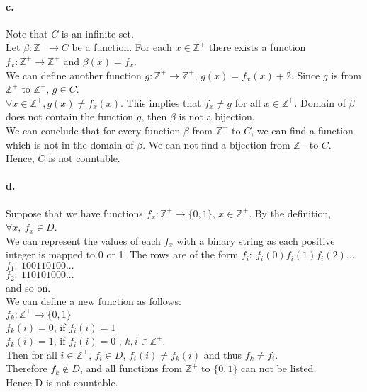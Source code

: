 \documentclass[11pt]{article}
\begin{document}
\paragraph{c.}
    Note that $C$ is an infinite set.\\
    Let $\beta : \mathbb{Z^+} \rightarrow C$ be a function. For each $x \in \mathbb{Z^+}$ there exists a function $f_x:\mathbb{Z^+} \rightarrow \mathbb{Z^+}$ and $\beta(x) = f_x$.\\
    We can define another function $g:\mathbb{Z^+} \rightarrow \mathbb{Z^+}$, $g(x) = f_x(x)+2$. Since $g$ is from $\mathbb{Z^+}$ to $\mathbb{Z^+}$, $g \in C$.\\$\forall x \in \mathbb{Z^+}, g(x) \neq f_x(x)$. This implies that $f_x \neq g$ for all $x \in \mathbb{Z^+}$. Domain of $\beta$ does not contain the function $g$, then $\beta$ is not a bijection.\\
    We can conclude that for every function $\beta$ from $\mathbb{Z^+}$ to $C$, we can find a function which is not in the domain of  $\beta$. We can not find a bijection from $\mathbb{Z^+}$ to $C$.\\
    Hence, $C$ is not countable. 
    
    
\paragraph{d.}
    Suppose that we have functions $f_x:\mathbb{Z^+} \rightarrow \{0,1\}$, $x \in \mathbb{Z^+}$. By the definition, $\forall x, \ f_x \in D$.\\
    We can represent the values of each $f_x$ with a binary string as each positive integer is mapped to 0 or 1. The rows are of the form $f_i: \ f_i(0)f_i(1)f_i(2)...$\\
    $f_1: \ 100110100...$\\
    $f_2: \ 110101000...$\\
    and so on.\\
    We can define a new function as follows:\\
    $f_k:\mathbb{Z^+} \rightarrow \{0,1\}$\\
    $f_k(i)=0$, if $f_i(i)=1$\\
    $f_k(i)=1$, if $f_i(i)=0$ , $k,i \in \mathbb{Z^+}$.\\
    Then for all $i \in \mathbb{Z^+}$, $f_i \in D$, $f_i(i) \neq f_k(i)$ and thus $f_k \neq f_i$.\\
    Therefore $f_k \notin D$, and all functions from $\mathbb{Z^+}$ to $\{0,1\}$ can not be listed.\\
    Hence D is not countable.
\end{document}
